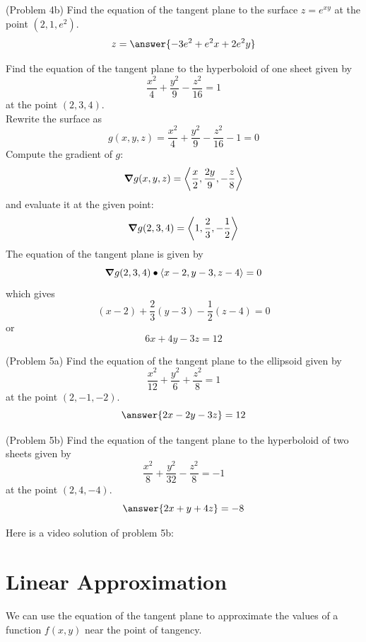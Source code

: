 \documentclass[handout]{ximera}
\begin{document}
\begin{problem}(Problem 4b)
Find the equation of the tangent plane to the surface $z =e^{xy}$ at 
the point $(2, 1, e^2)$.\\
\[
z = \answer{-3e^2 + e^2 x + 2e^2 y}
\]
\end{problem}

\begin{example}[Example 5]
Find the equation of the tangent plane to the hyperboloid of one sheet given by 
\[
\frac{x^2}{4} + \frac{y^2}{9} - \frac{z^2}{16} = 1
\]
at the point $(2, 3, 4)$.\\
Rewrite the surface as
\[
g(x,y,z) = \frac{x^2}{4} + \frac{y^2}{9} - \frac{z^2}{16} - 1 = 0
\]
Compute the gradient of $g$:
\[
\boldsymbol\nabla g(x,y,z) = \left\langle \frac{x}{2} , \frac{2y}{9}, - \frac{z}{8}\right\rangle
\]
and evaluate it at the given point:
\[
\boldsymbol\nabla g(2,3,4) = \left\langle 1, \frac{2}{3}, -\frac12\right\rangle
\]
The equation of the tangent plane is given by 
\[
\boldsymbol\nabla g(2, 3, 4) \bullet \left\langle x-2, y-3, z-4\right\rangle = 0
\]
which gives
\[
(x-2) + \frac23 (y-3) - \frac12 (z-4) = 0
\]
or
\[
6x + 4y - 3z = 12
\]
\end{example}

\begin{problem}(Problem 5a)
Find the equation of the tangent plane to the ellipsoid given by 
\[
\frac{x^2}{12} + \frac{y^2}{6} + \frac{z^2}{8} = 1
\]
at the point $(2, -1, -2)$.\\
\[
\answer{2x-2y-3z} = 12
\]
\end{problem}

\begin{problem}(Problem 5b)
Find the equation of the tangent plane to the hyperboloid of two sheets given by 
\[
\frac{x^2}{8} + \frac{y^2}{32} - \frac{z^2}{8} = -1
\]
at the point $(2, 4, -4)$.\\
\[
\answer{2x+y + 4z} = -8
\]
\end{problem}

Here is a video solution of problem 5b:\\
\begin{foldable}
\end{foldable}



\section{Linear Approximation}
We can use the equation of the tangent plane to approximate the values 
of a function $f(x,y)$ near the point of tangency.
\end{document}
